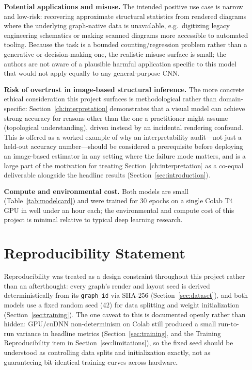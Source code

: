\documentclass[11pt,letterpaper]{article}
\numberwithin{equation}{section}
\numberwithin{figure}{section}
\numberwithin{table}{section}
\begin{document}
\textbf{Potential applications and misuse.} The intended positive use case is narrow and low-risk: recovering approximate structural statistics from rendered diagrams where the underlying graph-native data is unavailable, e.g.\ digitizing legacy engineering schematics or making scanned diagrams more accessible to automated tooling. Because the task is a bounded counting/regression problem rather than a generative or decision-making one, the realistic misuse surface is small; the authors are not aware of a plausible harmful application specific to this model that would not apply equally to any general-purpose CNN.

\textbf{Risk of overtrust in image-based structural inference.} The more concrete ethical consideration this project surfaces is methodological rather than domain-specific: Section~\ref{ch:interpretation} demonstrates that a visual model can achieve strong accuracy for reasons other than the one a practitioner might assume (topological understanding), driven instead by an incidental rendering confound. This is offered as a worked example of why an interpretability audit---not just a held-out accuracy number---should be considered a prerequisite before deploying an image-based estimator in any setting where the failure mode matters, and is a large part of the motivation for treating Section~\ref{ch:interpretation} as a co-equal deliverable alongside the headline results (Section~\ref{sec:introduction}).

\textbf{Compute and environmental cost.} Both models are small (Table~\ref{tab:modelcard}) and were trained for 30 epochs on a single Colab T4 GPU in well under an hour each; the environmental and compute cost of this project is minimal relative to typical deep learning research.

\section{Reproducibility Statement}
\label{sec:reproducibility}
Reproducibility was treated as a design constraint throughout this project rather than an afterthought: every graph's render and layout seed is derived deterministically from its \texttt{graph\_id} via SHA-256 (Section~\ref{sec:dataset}), and both models use a fixed random seed (42) for data splitting and weight initialization (Section~\ref{sec:training}). The one caveat to this is documented openly rather than hidden: GPU/cuDNN non-determinism on Colab still produced a small run-to-run variance in headline metrics (Section~\ref{sec:training}, and the Training Reproducibility item in Section~\ref{sec:limitations}), so the fixed seed should be understood as controlling data splits and initialization exactly, not as guaranteeing bit-identical training curves across hardware.
\end{document}
